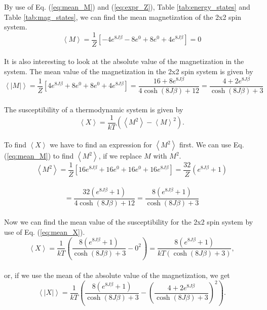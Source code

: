 \documentclass[12pt]{article}
\begin{document}
\begin{flushleft}
\begin{table}[!h]
\end{table}
\newpage
By use of Eq. (\ref{eq:mean_M}) and (\ref{eq:expr_Z}), Table \ref{tab:energy_states} and Table \ref{tab:mag_states}, we can find the mean magnetization of the 2x2 spin system.
\vspace{5mm}
$$\left<M\right> = \frac{1}{Z}\left[-4e^{8J\beta} - 8e^{0} + 8e^{0} + 4e^{8J\beta}\right] = 0$$\\
\vspace{5mm}
It is also interesting to look at the absolute value of the magnetization in the system. The mean value of the magnetization in the 2x2 spin system is given by
\vspace{5mm}
$$\left<|M|\right> = \frac{1}{Z}\left[4e^{8J\beta} + 8e^{0} + 8e^{0} + 4e^{8J\beta}\right] = \frac{16 + 8e^{8J\beta}}{4\cosh(8J\beta) + 12} = \frac{4 + 2e^{8J\beta}}{\cosh(8J\beta) + 3}$$\\
\vspace{5mm}
The susceptibility of a thermodynamic system is given by
\vspace{5mm}
\begin{equation}\label{eq:mean_X}
\left<X\right> = \frac{1}{kT}\left(\left<M^2\right> - \left< M \right>^2\right).
\end{equation}\\
To find $\left<X\right>$ we have to find an expression for $\left<M^2\right>$ first. We can use Eq. (\ref{eq:mean_M}) to find $\left<M^2\right>$, if we replace $M$ with $M^2$. 
\vspace{5mm}
$$\left<M^2\right> = \frac{1}{Z}\left[16e^{8J\beta} + 16e^{0} + 16e^{0} + 16e^{8J\beta}\right] = \frac{32}{Z}\left(e^{8J\beta} + 1\right)$$\\
\vspace{5mm}
$$ = \frac{32\left(e^{8J\beta} + 1\right)}{4\cosh(8J\beta) + 12} = \frac{8\left(e^{8J\beta} + 1\right)}{\cosh(8J\beta) + 3}$$\\
\vspace{5mm}
Now we can find the mean value of the susceptibility for the 2x2 spin system by use of Eq. (\ref{eq:mean_X}).
\vspace{5mm}
$$\left<X\right> = \frac{1}{kT}\left(\frac{8\left(e^{8J\beta} + 1\right)}{\cosh(8J\beta) + 3} - 0^2\right) = \frac{8\left(e^{8J\beta} + 1\right)}{kT\left(\cosh(8J\beta) + 3\right)},$$\\
\vspace{5mm}
or, if we use the mean of the absolute value of the magnetization, we get
\vspace{5mm}
$$\left<|X|\right> = \frac{1}{kT}\left(\frac{8\left(e^{8J\beta} + 1\right)}{\cosh(8J\beta) + 3} - \left(\frac{4 + 2e^{8J\beta}}{\cosh(8J\beta) + 3}\right)^2\right).$$\\
\newpage

\end{flushleft}
\end{document}
